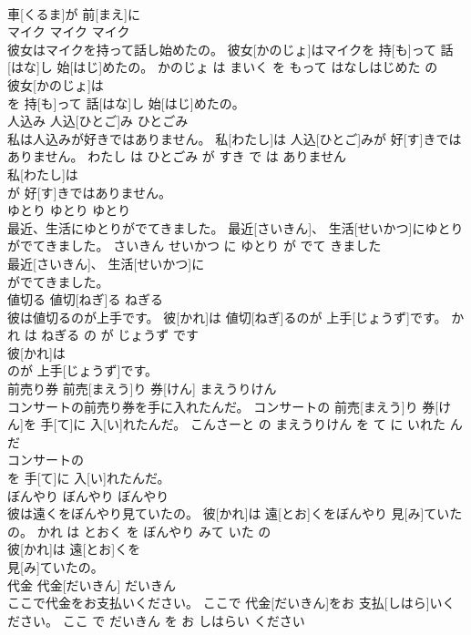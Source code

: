 \documentclass[8pt]{extreport}
\begin{document}
\begin{CJK}{UTF8}{min}
\\	車[くるま]が 前[まえ]に
\\	マイク	マイク	マイク	
\\	彼女はマイクを持って話し始めたの。	彼女[かのじょ]はマイクを 持[も]って 話[はな]し 始[はじ]めたの。	かのじょ は まいく を もって はなしはじめた の	
\\	彼女[かのじょ]は
\\	を 持[も]って 話[はな]し 始[はじ]めたの。			
\\	人込み	人込[ひとご]み	ひとごみ	
\\	私は人込みが好きではありません。	私[わたし]は 人込[ひとご]みが 好[す]きではありません。	わたし は ひとごみ が すき で は ありません	
\\	私[わたし]は
\\	が 好[す]きではありません。			
\\	ゆとり	ゆとり	ゆとり	
\\	最近、生活にゆとりがでてきました。	最近[さいきん]、 生活[せいかつ]にゆとりがでてきました。	さいきん せいかつ に ゆとり が でて きました	
\\	最近[さいきん]、 生活[せいかつ]に
\\	がでてきました。			
\\	値切る	値切[ねぎ]る	ねぎる	
\\	彼は値切るのが上手です。	彼[かれ]は 値切[ねぎ]るのが 上手[じょうず]です。	かれ は ねぎる の が じょうず です	
\\	彼[かれ]は
\\	のが 上手[じょうず]です。			
\\	前売り券	前売[まえう]り 券[けん]	まえうりけん	
\\	コンサートの前売り券を手に入れたんだ。	コンサートの 前売[まえう]り 券[けん]を 手[て]に 入[い]れたんだ。	こんさーと の まえうりけん を て に いれた ん だ	
\\	コンサートの
\\	を 手[て]に 入[い]れたんだ。			
\\	ぼんやり	ぼんやり	ぼんやり	
\\	彼は遠くをぼんやり見ていたの。	彼[かれ]は 遠[とお]くをぼんやり 見[み]ていたの。	かれ は とおく を ぼんやり みて いた の	
\\	彼[かれ]は 遠[とお]くを
\\	見[み]ていたの。			
\\	代金	代金[だいきん]	だいきん	
\\	ここで代金をお支払いください。	ここで 代金[だいきん]をお 支払[しはら]いください。	ここ で だいきん を お しはらい ください	

\end{CJK}
\end{document}
